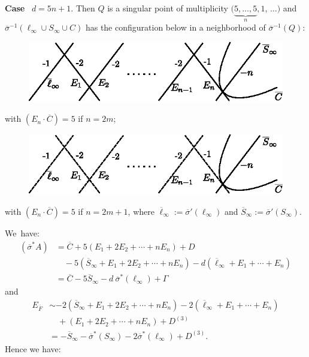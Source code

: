 \subsubsection{}\label{chap3:3.5.1}
{\bf Case}~ $d=5n+1$. Then $Q$ is a singular point of multiplicity
$(\underbrace{5,\ldots,5}_{n},1$, $\ldots)$ and
$\overline{\sigma}^{-1}(\ell_{\infty}\cup S_{\infty}\cup C)$ has the
configuration below in a neighborhood of $\overline{\sigma}^{-1}(Q)$:
\begin{figure}[H]
\centering
\includegraphics[scale=1.1]{figures/miyansi_fig36.eps}
\end{figure}
\noindent
with $(E_{n}\cdot\overline{C})=5$ if $n=2m$;
\begin{figure}[H]
\centering
\includegraphics[scale=1.1]{figures/miyansi_fig37.eps}
\end{figure}
\noindent
with $(E_{n}\cdot\overline{C})=5$ if $n=2m+1$, where
$\overline{\ell}_{\infty}:=\overline{\sigma}'(\ell_{\infty})$ and
$\overline{S}_{\infty}:=\overline{\sigma}'(S_{\infty})$. 

We\pageoriginale\ have:
\begin{align*}
  (\overline{\sigma}^{\ast}A) &=\overline{C}+5(E_{1}+2E_{2}+ \cdots +
  nE_{n})+D\\
  & \quad -5(\overline{S}_{\infty} + E_{1}+2E_{2}+\cdots+nE_{n})
   -d(\overline{\ell}_{\infty}+E_{1}+\cdots+E_{n})\\
  &= \overline{C}-5\overline{S}_{\infty}-d~\overline{\sigma}^{\ast}
  (\ell_{\infty})+ \Gamma 
\end{align*}
and
\begin{align*}
E_{\overline{F}} &\sim
-2(\overline{S}_{\infty}+E_{1}+2E_{2}+\cdots+nE_{n})-2(\overline{\ell}_{\infty}+E_{1}+\cdots+E_{n})\\
&\quad +(E_{1}+2E_{2}+\cdots+nE_{n})+D^{(3)}\\
&= -\overline{S}_{\infty}-\overline{\sigma}^{\ast}(S_{\infty})-2\overline{\sigma}^{\ast}(\ell_{\infty})+D^{(3)}.
\end{align*}
Hence we have:

